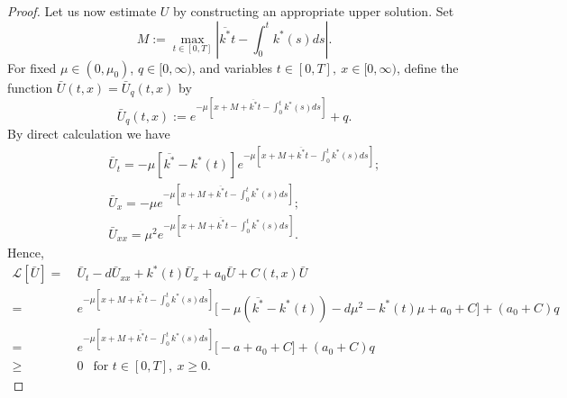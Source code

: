 \documentclass[11pt]{amsart}
\numberwithin{equation}{section}
\begin{document}
\begin{proof}
Let us now estimate $U$ by constructing an appropriate upper solution. Set 
\[M:= \max_{t\in[0,T]}\left|\overline{k^*}t-\int_0^tk^*(s)ds\right|.\]
For fixed $\mu\in(0,\mu_0)$,  $q\in[0,\infty)$, and variables $t\in[0,T], \ x\in[0,\infty)$,  define the function $\bar U(t,x)=\bar U_q(t,x)$ by
\[\bar{U}_q(t,x):= e^{-\mu[x+M+\overline{k^*}t-\int_0^tk^*(s)ds]}+ q.\]
By direct calculation we have
\begin{eqnarray*}
 && \bar{U}_t= -\mu  [\overline{k^*}-k^*(t)]e^{-\mu[x+M+\overline{k^*}t-\int_0^tk^*(s)ds]};\\
&&\bar{U}_x=-\mu   e^{-\mu[x+M+\overline{k^*}t-\int_0^tk^*(s)ds]};\\
&& \bar{U}_{xx}= \mu^2  e^{-\mu[x+M+\overline{k^*}t-\int_0^tk^*(s)ds]}.
\end{eqnarray*}
Hence, 
\begin{equation}\label{bar-U}
\begin{aligned}
  \mathcal{L}[\bar{U}]=&\ \bar{U}_t-d\bar{U}_{xx}+k^*(t)\bar{U}_x+a_0 \bar{U}+C(t,x)\bar{U} \\
  =&\ e^{-\mu[x+M+\overline{k^*}t-\int_0^tk^*(s)ds]}\Big[-\mu(\overline{k^*}-k^*(t))-d\mu^2-k^*(t)\mu +a_0+C\Big]+(a_0+C)q\\
  =&\ e^{-\mu[x+M+\overline{k^*}t-\int_0^tk^*(s)ds]}\big[-a+a_0+C\big]+(a_0+C)q\\
  \geq&\  0 \ \  \mbox{ for } t\in [0, T],\ x\geq 0.
\end{aligned}
\end{equation}


\end{proof}
\end{document}
